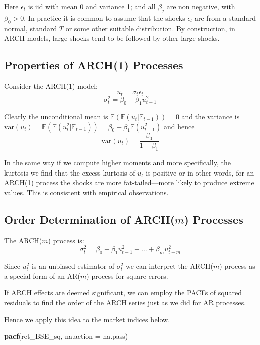 \documentclass[11pt,]{article}
\newenvironment{Shaded}{\begin{snugshade}}{\end{snugshade}}
\newcommand{\KeywordTok}[1]{\textcolor[rgb]{0.13,0.29,0.53}{\textbf{#1}}}
\newcommand{\DataTypeTok}[1]{\textcolor[rgb]{0.13,0.29,0.53}{#1}}
\newcommand{\NormalTok}[1]{#1}
\begin{document}
Here \(\epsilon_t\) is iid with mean 0 and variance 1; and all
\(\beta_j\) are non negative, with \(\beta_0>0\). In practice it is
common to assume that the shocks \(\epsilon_t\) are from a standard
normal, standard \(T\) or some other suitable distribution. By
construction, in ARCH models, large shocks tend to be followed by other
large shocks.

\subsection{Properties of ARCH(1)
Processes}\label{properties-of-arch1-processes}

Consider the ARCH(1) model: \[u_t = \sigma_t\epsilon_t\]
\[\sigma^2_t = \beta_0 + \beta_1u_{t-1}^2\]

Clearly the unconditional mean is
\(\mathbb{E}(\mathbb{E}(u_t|\mathbb{F}_{t-1})) = 0\) and the variance is
\(\text{var}(u_t)=\mathbb{E}(\mathbb{E}(u^2_t|\mathbb{F}_{t-1})) = \beta_0+\beta_1\mathbb{E}(u_{t-1}^2)\)
and hence \[\text{var}(u_t) = \frac{\beta_0}{1-\beta_1}\]

In the same way if we compute higher moments and more specifically, the
kurtosis we find that the excess kurtosis of \(u_t\) is positive or in
other words, for an ARCH(1) process the shocks are more
fat-tailed---more likely to produce extreme values. This is consistent
with empirical observations.

\subsection{\texorpdfstring{Order Determination of ARCH(\(m\))
Processes}{Order Determination of ARCH(m) Processes}}\label{order-determination-of-archm-processes}

The ARCH(\(m\)) process is:
\[\sigma_t^2 = \beta_0+\beta_1u_{t-1}^2+\hdots+\beta_mu_{t-m}^2\]

Since \(u_t^2\) is an unbiased estimator of \(\sigma_t^2\) we can
interpret the ARCH(\(m\)) process as a special form of an AR(\(m\))
process for square errors.

If ARCH effects are deemed significant, we can employ the PACFs of
squared residuals to find the order of the ARCH series just as we did
for AR processes.

Hence we apply this idea to the market indices below.

\begin{Shaded}
\begin{Highlighting}[]
\KeywordTok{pacf}\NormalTok{(ret_BSE_sq, }\DataTypeTok{na.action =}\NormalTok{ na.pass)}
\end{Highlighting}
\end{Shaded}
\end{document}
